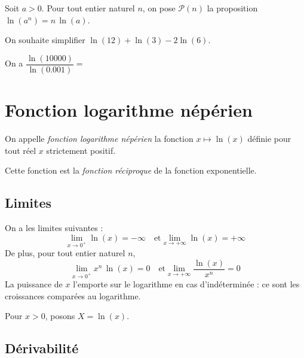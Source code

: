 \documentclass[11pt,fleqn, openany]{book} %
\begin{document}
\begin{demonstration}Soit $a>0$. Pour tout entier naturel $n$, on pose $\mathcal{P}(n)$ la proposition $\ln(a^n)=n\,\ln(a)$.

\vskip180pt

\end{demonstration}

\begin{example}On souhaite simplifier $\ln(12)+\ln(3)-2\ln(6)$.

\vskip30pt
\end{example}

\begin{example}On a $\dfrac{\ln(10000)}{\ln(0.001)}=$\end{example}


\section{Fonction logarithme népérien}


\begin{definition}On appelle \textit{fonction logarithme népérien} la fonction $x\mapsto \ln(x)$ définie pour tout réel $x$ strictement positif.

Cette fonction est la \textit{fonction réciproque} de la fonction exponentielle.\end{definition}

\subsection{Limites}

\begin{proposition}On a les limites suivantes :
\[ \lim_{x\to 0^+}\ln(x)=-\infty \quad\text{et} \lim_{x\to +\infty} \ln(x) = +\infty \]
De plus, pour tout entier naturel $n$,
\[ \lim_{x\to 0^+}x^n\,\ln(x) = 0\quad \text{et}\lim_{x\to +\infty} \dfrac{\ln(x)}{x^n}=0\]
La puissance de $x$ l'emporte sur le logarithme en cas d'indéterminée : ce sont les croissances comparées au logarithme.\end{proposition}

\begin{demonstration}

Pour $x>0$, posons $X=\ln(x)$. 

\end{demonstration}

\newpage

\subsection{Dérivabilité}
\end{document}
